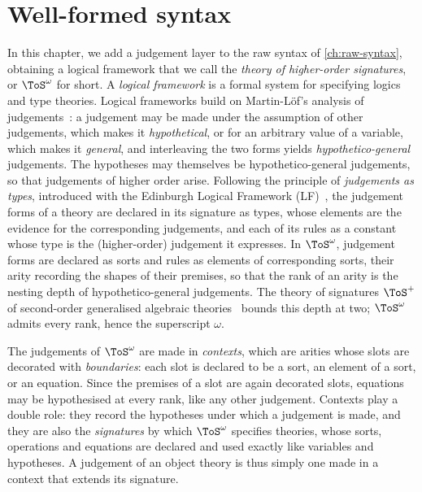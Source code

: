 \chapter{Well-formed syntax}
\label{ch:wf-syntax}

In this chapter, we add a judgement layer to the raw syntax of \cref{ch:raw-syntax}, obtaining a logical framework that we call the \emph{theory of higher-order signatures}, or $\ToS^\omega$ for short. A \emph{logical framework} is a formal system for specifying logics and type theories. Logical frameworks build on Martin-L{\"o}f's analysis of judgements~\cite{MartinLof1996}: a judgement may be made under the assumption of other judgements, which makes it \emph{hypothetical}, or for an arbitrary value of a variable, which makes it \emph{general}, and interleaving the two forms yields \emph{hypothetico-general} judgements. The hypotheses may themselves be hypothetico-general judgements, so that judgements of higher order arise. Following the principle of \emph{judgements as types}, introduced with the Edinburgh Logical Framework (LF)~\cite{HarperHonsellPlotkin1993}, the judgement forms of a theory are declared in its signature as types, whose elements are the evidence for the corresponding judgements, and each of its rules as a constant whose type is the (higher-order) judgement it expresses. In $\ToS^\omega$, judgement forms are declared as sorts and rules as elements of corresponding sorts, their arity recording the shapes of their premises, so that the rank of an arity is the nesting depth of hypothetico-general judgements. The theory of signatures $\ToS^+$ of second-order generalised algebraic theories~\cite{KaposiXie2024} bounds this depth at two; $\ToS^\omega$ admits every rank, hence the superscript $\omega$.

The judgements of $\ToS^\omega$ are made in \emph{contexts}, which are arities whose slots are decorated with \emph{boundaries}: each slot is declared to be a sort, an element of a sort, or an equation. Since the premises of a slot are again decorated slots, equations may be hypothesised at every rank, like any other judgement. Contexts play a double role: they record the hypotheses under which a judgement is made, and they are also the \emph{signatures} by which $\ToS^\omega$ specifies theories, whose sorts, operations and equations are declared and used exactly like variables and hypotheses. A judgement of an object theory is thus simply one made in a context that extends its signature.

